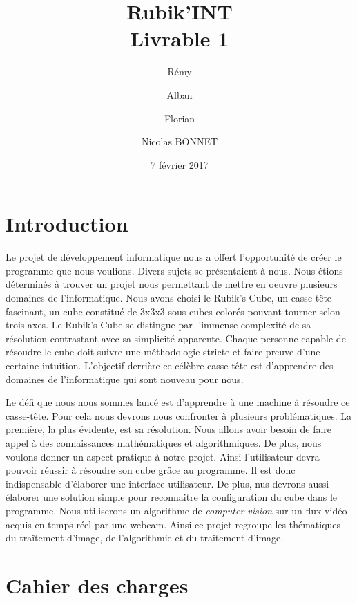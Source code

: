 \documentclass[a4paper]{report}
\title{Rubik'INT \\ Livrable 1}
\author{Rémy \bsc{ZIRNHELD} \and Alban \bsc{MANZANO} \and Florian \bsc{GRANTE} \and Nicolas {BONNET}}
\date{7 février 2017}
\begin{document}
\maketitle

\tableofcontents

\chapter*{Introduction}

Le projet de développement informatique nous a offert l'opportunité de créer le programme que nous voulions.
Divers sujets se présentaient à nous. Nous étions déterminés à trouver un projet nous permettant de mettre en oeuvre plusieurs domaines de l'informatique. 
Nous avons choisi le Rubik's Cube, un casse-tête fascinant, un cube constitué de 3x3x3 sous-cubes colorés pouvant tourner selon trois axes. 
Le Rubik's Cube se distingue par l'immense complexité de sa résolution contrastant avec sa simplicité apparente.
Chaque personne capable de résoudre le cube doit suivre une méthodologie stricte et faire preuve d'une certaine intuition.
L'objectif derrière ce célèbre casse tête est d'apprendre des domaines de l'informatique qui sont nouveau pour nous.

Le défi que nous nous sommes lancé est d'apprendre à une machine à résoudre ce casse-tête.
Pour cela nous devrons nous confronter à plusieurs problématiques.
La première, la plus évidente, est sa résolution. Nous allons avoir besoin de faire appel à des connaissances mathématiques et algorithmiques.
De plus, nous voulons donner un aspect pratique à notre projet. Ainsi l'utilisateur devra pouvoir réussir à résoudre son cube grâce au programme.
Il est donc indispensable d'élaborer une interface utilisateur.
De plus, nus devrons aussi élaborer une solution simple pour reconnaitre la configuration du cube dans le programme. Nous utiliserons un algorithme de \textit{computer vision} sur un flux vidéo acquis en temps réel par une webcam.
Ainsi ce projet regroupe les thématiques du traîtement d'image, de l'algorithmie et du traîtement d'image.


\chapter{Cahier des charges}
\end{document}
